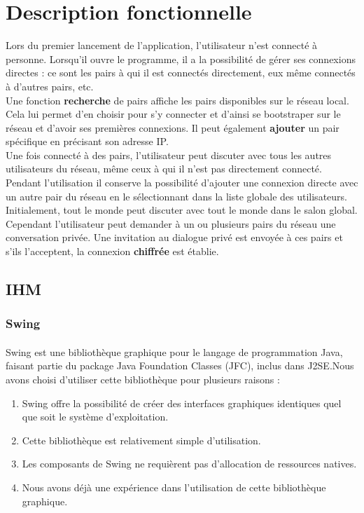 \documentclass[french,11pt,a4]{article}
\begin{document}
\section{Description fonctionnelle}
Lors du premier lancement de l'application, l'utilisateur n'est connecté à personne. Lorsqu'il ouvre le programme, il a la possibilité de gérer ses connexions directes : ce sont les pairs à qui il est connectés directement, eux même connectés à d'autres pairs, etc.\\

Une fonction \textbf{recherche} de pairs affiche les pairs disponibles sur le réseau local. Cela lui permet d'en choisir pour s'y connecter et d'ainsi se bootstraper sur le réseau et d'avoir ses premières connexions. Il peut également \textbf{ajouter} un pair spécifique en précisant son adresse IP.\\

Une fois connecté à des pairs, l'utilisateur peut discuter avec tous les autres utilisateurs du réseau, même ceux à qui il n'est pas directement connecté. Pendant l'utilisation il conserve la possibilité d'ajouter une connexion directe avec un autre pair du réseau en le sélectionnant dans la liste globale des utilisateurs.\\

Initialement, tout le monde peut discuter avec tout le monde dans le salon global. Cependant l'utilisateur peut demander à un ou plusieurs pairs du réseau une conversation privée. Une invitation au dialogue privé est envoyée à ces pairs et s'ils l'acceptent, la connexion \textbf{chiffrée} est établie.\\

\subsection{IHM}

\subsubsection{Swing}
\paragraph{}
Swing est une bibliothèque graphique pour le langage de programmation
Java, faisant partie du package Java Foundation Classes (JFC), inclus
dans J2SE.Nous avons choisi d'utiliser cette bibliothèque pour
plusieurs raisons :
\begin{enumerate}
\item{Swing offre la possibilité de créer des interfaces graphiques identiques quel que soit le système d'exploitation.}
\item{Cette bibliothèque est relativement simple d'utilisation.}
\item{Les composants de Swing ne requièrent pas d'allocation de ressources natives.}
\item{Nous avons déjà une expérience dans l'utilisation de cette bibliothèque graphique.}
\end{enumerate}
\end{document}
